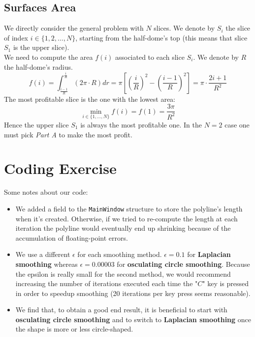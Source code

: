 \documentclass{article}
\theoremstyle{definition}
\theoremstyle{definition}
\theoremstyle{definition}
\begin{document}
\subsection{Surfaces Area}

We directly consider the general problem with $N$ slices. We denote by $S_i$ the slice of index $i\in\lbrace 1,2,\ldots,N\rbrace$, starting from the half-dome's top (this means that slice $S_1$ is the upper slice).\\

We need to compute the area $f(i)$ associated to each slice $S_i$. We denote by $R$ the half-dome's radius.
$$ f(i) = \int_{\frac{i-1}{R}}^{\frac{i}{R}} \left( 2\pi\cdot R \right) dr = \pi \left[ \left(\frac{i}{R}\right)^2 - \left(\frac{i - 1}{R}\right)^2 \right] = \pi \cdot \frac{2i + 1}{R^2}$$
The most profitable slice is the one with the lowest area:
$$ \min_{i\in\lbrace 1,\ldots,N\rbrace } f(i) = f(1) = \frac{3\pi}{R^2} $$
Hence the upper slice $S_1$ is always the most profitable one. In the $N=2$ case one must pick \textit{Part A} to make the most profit.

\section{Coding Exercise}

Some notes about our code:
\begin{itemize}
\item We added a field to the \texttt{MainWindow} structure to store the polyline's length when it's created. Otherwise, if we tried to re-compute the length at each iteration the polyline would eventually end up shrinking because of the accumulation of floating-point errors.
\item We use a different $\epsilon$ for each smoothing method. $\epsilon = 0.1$ for \textbf{Laplacian smoothing} whereas $\epsilon = 0.00003$ for \textbf{osculating circle smoothing}. Because the epsilon is really small for the second method, we would recommend increasing the number of iterations executed each time the "$C$" key is pressed in order to speedup smoothing (20 iterations per key press seems reasonable).
\item We find that, to obtain a good end result, it is beneficial to start with \textbf{osculating circle smoothing} and to switch to \textbf{Laplacian smoothing} once the shape is more or less circle-shaped.
\end{itemize}
\end{document}
